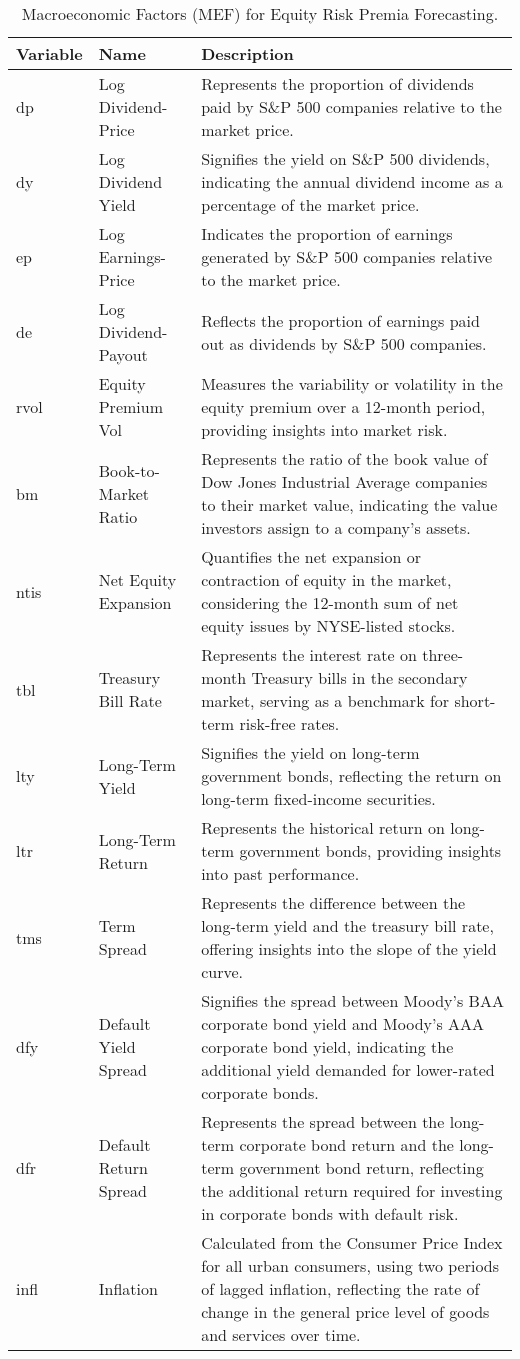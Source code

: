 \begin{table}[H]
  \centering
  \begin{tabular}{|l|l|p{7.5cm}|}
  \hline
  \textbf{Variable} & \textbf{Name} & \textbf{Description} \\
  \hline
  dp & Log Dividend-Price & Represents the proportion of dividends paid by S\&P 500 companies relative to the market price. \\
  dy & Log Dividend Yield & Signifies the yield on S\&P 500 dividends, indicating the annual dividend income as a percentage of the market price. \\
  ep & Log Earnings-Price & Indicates the proportion of earnings generated by S\&P 500 companies relative to the market price. \\
  de & Log Dividend-Payout & Reflects the proportion of earnings paid out as dividends by S\&P 500 companies. \\
  rvol & Equity Premium Vol & Measures the variability or volatility in the equity premium over a 12-month period, providing insights into market risk. \\
  bm & Book-to-Market Ratio & Represents the ratio of the book value of Dow Jones Industrial Average companies to their market value, indicating the value investors assign to a company's assets. \\
  ntis & Net Equity Expansion & Quantifies the net expansion or contraction of equity in the market, considering the 12-month sum of net equity issues by NYSE-listed stocks. \\
  tbl & Treasury Bill Rate & Represents the interest rate on three-month Treasury bills in the secondary market, serving as a benchmark for short-term risk-free rates. \\
  lty & Long-Term Yield & Signifies the yield on long-term government bonds, reflecting the return on long-term fixed-income securities. \\
  ltr & Long-Term Return & Represents the historical return on long-term government bonds, providing insights into past performance. \\
  tms & Term Spread & Represents the difference between the long-term yield and the treasury bill rate, offering insights into the slope of the yield curve. \\
  dfy & Default Yield Spread & Signifies the spread between Moody's BAA corporate bond yield and Moody's AAA corporate bond yield, indicating the additional yield demanded for lower-rated corporate bonds. \\
  dfr & Default Return Spread & Represents the spread between the long-term corporate bond return and the long-term government bond return, reflecting the additional return required for investing in corporate bonds with default risk. \\
  infl & Inflation & Calculated from the Consumer Price Index for all urban consumers, using two periods of lagged inflation, reflecting the rate of change in the general price level of goods and services over time. \\
  \hline
  \end{tabular}
  \caption{Macroeconomic Factors (MEF) for Equity Risk Premia Forecasting.}
  \label{tab:MEF}
  \end{table}